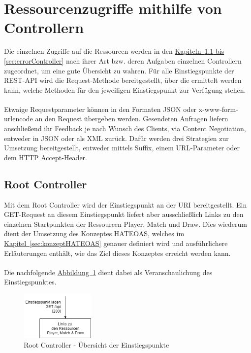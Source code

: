 \section{Ressourcenzugriffe mithilfe von Controllern}\label{sec:controller}
Die einzelnen Zugriffe auf die Ressourcen werden in den \hyperref[sec:rootController, sec:errorController]{Kapiteln~\ref{sec:rootController} bis \ref{sec:errorController}} nach ihrer Art bzw. deren Aufgaben einzelnen Controllern zugeordnet, um eine gute Übersicht zu wahren. Für alle Einstiegspunkte der \gls{REST}-\gls{API} wird die Request-Methode  bereitgestellt, über die ermittelt werden kann, welche Methoden für den jeweiligen Einstiegspunkt zur Verfügung stehen.\\
\\
Etwaige Requestparameter können in den Formaten \gls{JSON} oder x-www-form-urlencode an den Request übergeben werden. Gesendeten Anfragen liefern anschließend ihr Feedback je nach Wunsch des Clients, via Content Negotiation, entweder in \gls{JSON} oder als \gls{XML} zurück. Dafür werden drei Strategien zur Umsetzung bereitgestellt, entweder mittels Suffix, einem URL-Parameter oder dem \gls{HTTP} Accept-Header. 

\subsection{Root Controller}\label{sec:rootController}
Mit dem Root Controller wird der Einstiegspunkt an der \gls{URI}  bereitgestellt. Ein GET-Request an diesem Einstiegspunkt liefert aber ausschließlich Links zu den einzelnen Startpunkten der Ressourcen Player, Match und Draw. Dies wiederum dient der Umsetzung des Konzeptes HATEOAS, welches im \hyperref[sec:konzeptHATEOAS]{Kapitel~\ref{sec:konzeptHATEOAS}} genauer definiert wird und ausführlichere Erläuterungen enthält, wie das Ziel dieses Konzeptes erreicht werden kann.\\
\\
Die nachfolgende \hyperref[fig:rootController]{Abbildung~\ref{fig:rootController}} dient dabei als Veranschaulichung des Einstiegspunktes.\\
\begin{figure}[htb]
	\includegraphics[width=0.323\textwidth]{images/root-controller.png}
	\caption{Root Controller - Übersicht der Einstiegspunkte}
	\label{fig:rootController}
\end{figure}

